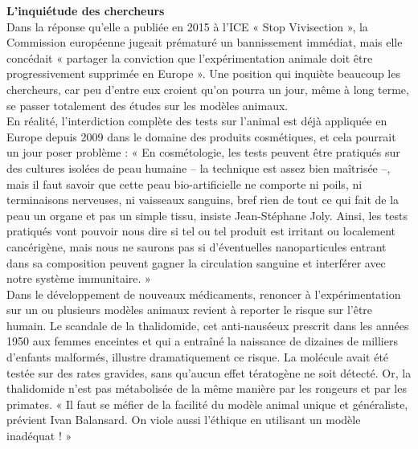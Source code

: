 \documentclass[10pt]{article}
\begin{document}
\textbf{ L’inquiétude des chercheurs}\\
 
 Dans la réponse qu’elle a publiée en 2015 à l’ICE « Stop Vivisection », la Commission européenne jugeait prématuré un bannissement immédiat, mais elle concédait « partager la conviction que l’expérimentation animale doit être progressivement supprimée en Europe ». Une position qui inquiète beaucoup les chercheurs, car peu d’entre eux croient qu’on pourra un jour, même à long terme, se passer totalement des études sur les modèles animaux.\\
 
 En réalité, l’interdiction complète des tests sur l’animal est déjà appliquée en Europe depuis 2009 dans le domaine des produits cosmétiques, et cela pourrait un jour poser problème : « En cosmétologie, les tests peuvent être pratiqués sur des cultures isolées de peau humaine – la technique est assez bien maîtrisée –, mais il faut savoir que cette peau bio-artificielle ne comporte ni poils, ni terminaisons nerveuses, ni vaisseaux sanguins, bref rien de tout ce qui fait de la peau un organe et pas un simple tissu, insiste Jean-Stéphane Joly. Ainsi, les tests pratiqués vont pouvoir nous dire si tel ou tel produit est irritant ou localement cancérigène, mais nous ne saurons pas si d’éventuelles nanoparticules entrant dans sa composition peuvent gagner la circulation sanguine et interférer avec notre système immunitaire. » \\
 
 Dans le développement de nouveaux médicaments, renoncer à l’expérimentation sur un ou plusieurs modèles animaux revient à reporter le risque sur l’être humain. Le scandale de la thalidomide, cet anti-nauséeux prescrit dans les années 1950 aux femmes enceintes et qui a entraîné la naissance de dizaines de milliers d’enfants malformés, illustre dramatiquement ce risque. La molécule avait été testée sur des rates gravides, sans qu’aucun effet tératogène ne soit détecté. Or, la thalidomide n’est pas métabolisée de la même manière par les rongeurs et par les primates. « Il faut se méfier de la facilité du modèle animal unique et généraliste, prévient Ivan Balansard. On viole aussi l’éthique en utilisant un modèle inadéquat ! »\\
 
\end{document}
